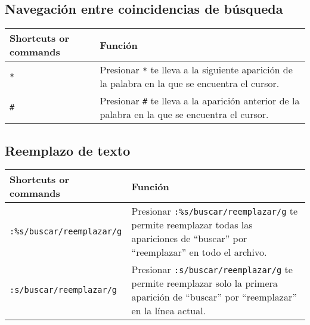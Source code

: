\documentclass[
  doc,
  floatsintext,
  longtable,
  a4paper,
  nolmodern,
  notxfonts,
  notimes,
  colorlinks=true,linkcolor=blue,citecolor=blue,urlcolor=blue]{apa7}
\begin{document}
\subsection{Navegación entre coincidencias de
búsqueda}\label{navegaciuxf3n-entre-coincidencias-de-buxfasqueda}

\begin{longtable}[]{@{}
  >{\raggedright\arraybackslash}p{}
  >{\raggedright\arraybackslash}p{}@{}}
\toprule\noalign{}
\begin{minipage}[b]{\linewidth}\raggedright
Shortcuts or commands
\end{minipage} & \begin{minipage}[b]{\linewidth}\raggedright
Función
\end{minipage} \\
\midrule\noalign{}
\endhead
\bottomrule\noalign{}
\endlastfoot
\texttt{*} & Presionar \texttt{*} te lleva a la siguiente aparición de
la palabra en la que se encuentra el cursor. \\
\texttt{\#} & Presionar \texttt{\#} te lleva a la aparición anterior de
la palabra en la que se encuentra el cursor. \\
\end{longtable}

\subsection{Reemplazo de texto}\label{reemplazo-de-texto}

\begin{longtable}[]{@{}
  >{\raggedright\arraybackslash}p{}
  >{\raggedright\arraybackslash}p{}@{}}
\toprule\noalign{}
\begin{minipage}[b]{\linewidth}\raggedright
Shortcuts or commands
\end{minipage} & \begin{minipage}[b]{\linewidth}\raggedright
Función
\end{minipage} \\
\midrule\noalign{}
\endhead
\bottomrule\noalign{}
\endlastfoot
\texttt{:\%s/buscar/reemplazar/g} & Presionar
\texttt{:\%s/buscar/reemplazar/g} te permite reemplazar todas las
apariciones de ``buscar'' por ``reemplazar'' en todo el archivo. \\
\texttt{:s/buscar/reemplazar/g} & Presionar
\texttt{:s/buscar/reemplazar/g} te permite reemplazar solo la primera
aparición de ``buscar'' por ``reemplazar'' en la línea actual. \\
\end{longtable}
\end{document}
